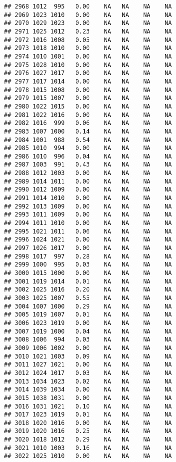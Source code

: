 \documentclass{article}\usepackage{graphicx, color}
\makeatletter
\newenvironment{kframe}{%
 \def\at@end@of@kframe{}%
 \ifinner\ifhmode%
  \def\at@end@of@kframe{\end{minipage}}%
  \begin{minipage}{\columnwidth}%
 \fi\fi%
 \def\FrameCommand##1{\hskip\@totalleftmargin \hskip-\fboxsep
 \colorbox{shadecolor}{##1}\hskip-\fboxsep
     \hskip-\linewidth \hskip-\@totalleftmargin \hskip\columnwidth}%
 \MakeFramed {\advance\hsize-\width
   \@totalleftmargin\z@ \linewidth\hsize
   \@setminipage}}%
 {\par\unskip\endMakeFramed%
 \at@end@of@kframe}
\newenvironment{knitrout}{}{} %
\makeatother
\begin{document}
\begin{knitrout}
\begin{kframe}
\begin{verbatim}
## 2968 1012  995   0.00    NA   NA    NA    NA
## 2969 1023 1010   0.00    NA   NA    NA    NA
## 2970 1029 1023   0.00    NA   NA    NA    NA
## 2971 1025 1012   0.23    NA   NA    NA    NA
## 2972 1016 1008   0.05    NA   NA    NA    NA
## 2973 1018 1010   0.00    NA   NA    NA    NA
## 2974 1010 1001   0.00    NA   NA    NA    NA
## 2975 1028 1010   0.00    NA   NA    NA    NA
## 2976 1027 1017   0.00    NA   NA    NA    NA
## 2977 1017 1014   0.00    NA   NA    NA    NA
## 2978 1015 1008   0.00    NA   NA    NA    NA
## 2979 1015 1007   0.00    NA   NA    NA    NA
## 2980 1022 1015   0.00    NA   NA    NA    NA
## 2981 1022 1016   0.00    NA   NA    NA    NA
## 2982 1016  999   0.06    NA   NA    NA    NA
## 2983 1007 1000   0.14    NA   NA    NA    NA
## 2984 1001  988   0.54    NA   NA    NA    NA
## 2985 1010  994   0.00    NA   NA    NA    NA
## 2986 1010  996   0.04    NA   NA    NA    NA
## 2987 1003  991   0.43    NA   NA    NA    NA
## 2988 1012 1003   0.00    NA   NA    NA    NA
## 2989 1014 1011   0.00    NA   NA    NA    NA
## 2990 1012 1009   0.00    NA   NA    NA    NA
## 2991 1014 1010   0.00    NA   NA    NA    NA
## 2992 1013 1009   0.00    NA   NA    NA    NA
## 2993 1011 1009   0.00    NA   NA    NA    NA
## 2994 1011 1010   0.00    NA   NA    NA    NA
## 2995 1021 1011   0.06    NA   NA    NA    NA
## 2996 1024 1021   0.00    NA   NA    NA    NA
## 2997 1026 1017   0.00    NA   NA    NA    NA
## 2998 1017  997   0.28    NA   NA    NA    NA
## 2999 1000  995   0.03    NA   NA    NA    NA
## 3000 1015 1000   0.00    NA   NA    NA    NA
## 3001 1019 1014   0.01    NA   NA    NA    NA
## 3002 1025 1016   0.20    NA   NA    NA    NA
## 3003 1025 1007   0.55    NA   NA    NA    NA
## 3004 1007 1000   0.29    NA   NA    NA    NA
## 3005 1019 1007   0.01    NA   NA    NA    NA
## 3006 1023 1019   0.00    NA   NA    NA    NA
## 3007 1019 1000   0.04    NA   NA    NA    NA
## 3008 1006  994   0.03    NA   NA    NA    NA
## 3009 1006 1002   0.00    NA   NA    NA    NA
## 3010 1021 1003   0.09    NA   NA    NA    NA
## 3011 1027 1021   0.00    NA   NA    NA    NA
## 3012 1024 1017   0.03    NA   NA    NA    NA
## 3013 1034 1023   0.02    NA   NA    NA    NA
## 3014 1039 1034   0.00    NA   NA    NA    NA
## 3015 1038 1031   0.00    NA   NA    NA    NA
## 3016 1031 1021   0.10    NA   NA    NA    NA
## 3017 1023 1019   0.01    NA   NA    NA    NA
## 3018 1020 1016   0.00    NA   NA    NA    NA
## 3019 1020 1016   0.25    NA   NA    NA    NA
## 3020 1018 1012   0.29    NA   NA    NA    NA
## 3021 1010 1003   0.16    NA   NA    NA    NA
## 3022 1025 1010   0.00    NA   NA    NA    NA

\end{verbatim}
\end{kframe}
\end{knitrout}
\end{document}
